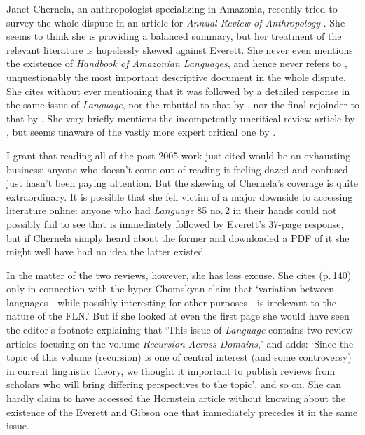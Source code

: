 \documentclass[output=paper,colorlinks,citecolor=brown
]{langscibook}
\begin{document}
Janet Chernela, an anthropologist specializing in Amazonia, recently
tried to survey the whole dispute in an article for \textit{Annual
Review of Anthropology} \citep{Chernela23}. She seems to think she
is providing a balanced summary, but her treatment of the relevant
literature is hopelessly skewed against Everett. She never even
mentions the existence of \textit{Handbook of Amazonian Languages},
and hence never refers to \citet{Everett86HAL}, unquestionably the
most important descriptive document in the whole dispute. She cites
\citet{NevPesRod09a} without ever mentioning that it was followed by
a detailed response \citep{Everett09} in the same issue of
\textit{Language}, nor the rebuttal to that by \citet{NevPesRod09b},
nor the final rejoinder to that by \citet{Everett13}. She very
briefly mentions the incompetently uncritical review article by
\citet{Hornstein19}, but seems unaware of the vastly more expert
critical one by \citet{EverGibs19}.

I grant that reading all of the post-2005 work just cited would be
an exhausting business: anyone who doesn't come out of reading it
feeling dazed and confused just hasn't been paying attention. But
the skewing of Chernela's coverage is quite extraordinary. It is
possible that she fell victim of a major downside to accessing
literature online: anyone who had \textit{Language} 85 no.\,2 in
their hands could not possibly fail to see that \citet{NevPesRod09a}
is immediately followed by Everett's 37-page response, but if Chernela
simply heard about the former and downloaded a PDF of it she might well
have had no idea the latter existed.

In the matter of the two reviews, however, she has less excuse. She
cites \citet{Hornstein19} (p.\,140) only in connection with the
hyper-Chomskyan claim that `variation between languages---while
possibly interesting for other purposes---is irrelevant to the nature
of the FLN.' But if she looked at even the first page she would have
seen the editor's footnote explaining that `This issue of
\textit{Language} contains two review articles focusing on the
volume \textit{Recursion Across Domains},' and adds: `Since the
topic of this volume (recursion) is one of central interest (and some
controversy) in current linguistic theory, we thought it important
to publish reviews from scholars who will bring differing perspectives
to the topic', and so on. She can hardly claim to have accessed the
Hornstein article without knowing about the existence of the Everett
and Gibson one that immediately precedes it in the same issue.
\end{document}
